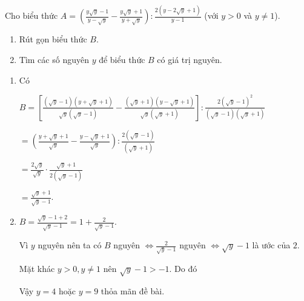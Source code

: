 \begin{ex}%
	Cho biểu thức $A = \left( \displaystyle \frac{y\sqrt{y}-1}{y- \sqrt{y}}- \frac{y \sqrt{y}+1}{y+\sqrt{y}}\right):\displaystyle \frac{2\left(y-2\sqrt{y}+1\right)}{y-1}$ (với $y >0$ và $y \ne 1$). 
	
	\begin{enumerate}[1)]
		\item Rút gọn biểu thức $B$.
		
		\item Tìm các số nguyên $y$ để biểu thức $B$ có giá trị nguyên.
	\end{enumerate}
\loigiai
	{
	\begin{enumerate}[1)]
		\item Có
		
		$B= \left[
		\displaystyle \frac{\left(\sqrt{y}-1\right) \left( y + \sqrt{y} +1\right)}{\sqrt{y}\left(\sqrt{y}-1\right)}- 
		\frac{\left(\sqrt{y}+1\right) \left( y - \sqrt{y} +1\right)}{\sqrt{y}\left(\sqrt{y}+1\right)}
		\right]:
		\displaystyle \frac{2 \left(\sqrt{y}-1\right)^2}{\left(\sqrt{y}-1\right) \left( \sqrt{y}+1\right)}$
		
		$= \left(
		\displaystyle \frac{ y + \sqrt{y} +1}{\sqrt{y}}- 
		\frac{ y - \sqrt{y} +1}{\sqrt{y}}
		\right):
		\displaystyle \frac{2 \left(\sqrt{y}-1\right)}{\left( \sqrt{y}+1\right)}$
		
		$\displaystyle =\frac{2 \sqrt{y}}{\sqrt{y}} \cdot \frac{\sqrt{y}+1}{2\left(\sqrt{y}-1\right)}$
		
		$\displaystyle =\frac{\sqrt{y}+1}{\sqrt{y}-1}$.
		
		\item $B = \displaystyle \frac{\sqrt{y}-1+2}{\sqrt{y}-1} =1 + \frac{2}{\sqrt{y}-1}$.
		
		Vì $y$ nguyên nên ta có $B$ nguyên $\Leftrightarrow \displaystyle \frac{2}{\sqrt{y}-1}$ nguyên $\Leftrightarrow \sqrt{y}-1$ là ước của $2$.
		
		Mặt khác $y>0, y \ne 1$ nên $\sqrt{y}-1 > -1$. Do đó 
		
		Vậy $y=4$ hoặc $y=9$ thỏa mãn đề bài.
	\end{enumerate}
	}
\end{ex}

